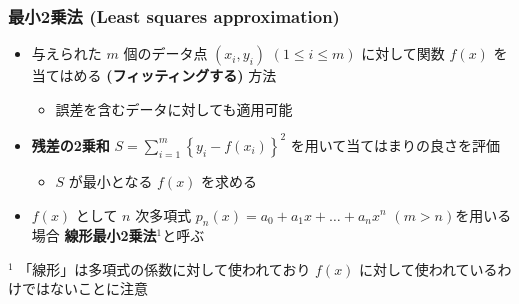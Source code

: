 \documentclass[dvipdfmx,aspectratio=169,20pt]{beamer}
\newcommand{\myfontsetting}[3]{{\fontsize{#1}{#2}\selectfont #3}}
\begin{document}
\begin{frame}
\frametitle{最小2乗法 \myfontsetting{15pt}{15pt}{ (Least squares approximation)}}

\begin{itemize}
    \setlength{\itemsep}{0.05cm}
    \item \myfontsetting{15pt}{15pt}{
    与えられた $m$ 個のデータ点 $(x_i,y_i)$ \myfontsetting{12pt}{12pt}{ $(1\le i \le m)$} に対して関数 $f(x)$ を当てはめる  \myfontsetting{10pt}{10pt}{\bf (フィッティングする)} 方法
    }
    \begin{itemize}
        \item \myfontsetting{12pt}{12pt}{
        誤差を含むデータに対しても適用可能
        }
    \end{itemize}
    \item \myfontsetting{15pt}{15pt}{
    {\bf 残差の2乗和} \myfontsetting{12pt}{12pt}{$\displaystyle
    S=\sum_{i=1}^m \left\{ y_i -f(x_i) \right\}^2$} を用いて当てはまりの良さを評価
    }
    \begin{itemize}
        \item \myfontsetting{12pt}{12pt}{
        $S$ が最小となる $f(x)$ を求める
        }
    \end{itemize}
    \item \myfontsetting{15pt}{20pt}{
    $f(x)$ として $n$ 次多項式 \myfontsetting{12pt}{12pt}{ $p_n(x)=a_0 + a_1x + \dots + a_nx^n$} \myfontsetting{10pt}{10pt}{$(m>n)$}を用いる場合 {\bf 線形最小2乗法}$^1$と呼ぶ
    }
\end{itemize}

\vspace{-2mm}

\myfontsetting{8pt}{8pt}{ $^1$ 「線形」は多項式の係数に対して使われており $f(x)$ に対して使われているわけではないことに注意}
\end{frame}
\end{document}

